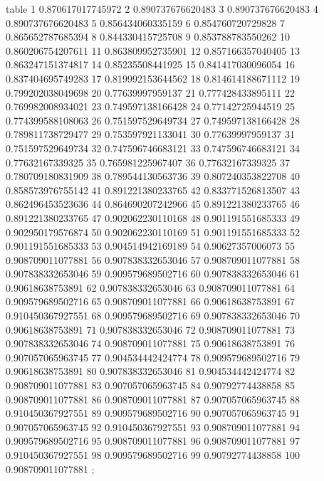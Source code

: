 table {%
	1 0.870617017745972
	2 0.890737676620483
	3 0.890737676620483
	4 0.890737676620483
	5 0.856434060335159
	6 0.854760720729828
	7 0.865652787685394
	8 0.844330415725708
	9 0.853788783550262
	10 0.860206754207611
	11 0.863809952735901
	12 0.857166357040405
	13 0.863247151374817
	14 0.85235508441925
	15 0.841417030096054
	16 0.837404695749283
	17 0.819992153644562
	18 0.814614188671112
	19 0.799202038049698
	20 0.77639997959137
	21 0.777428433895111
	22 0.769982008934021
	23 0.749597138166428
	24 0.77142725944519
	25 0.774399588108063
	26 0.751597529649734
	27 0.749597138166428
	28 0.789811738729477
	29 0.753597921133041
	30 0.77639997959137
	31 0.751597529649734
	32 0.747596746683121
	33 0.747596746683121
	34 0.77632167339325
	35 0.765981225967407
	36 0.77632167339325
	37 0.780709180831909
	38 0.789544130563736
	39 0.807240353822708
	40 0.858573976755142
	41 0.891221380233765
	42 0.833771526813507
	43 0.862496453523636
	44 0.864690207242966
	45 0.891221380233765
	46 0.891221380233765
	47 0.902062230110168
	48 0.901191551685333
	49 0.902950179576874
	50 0.902062230110169
	51 0.901191551685333
	52 0.901191551685333
	53 0.904514942169189
	54 0.90627357006073
	55 0.908709011077881
	56 0.907838332653046
	57 0.908709011077881
	58 0.907838332653046
	59 0.909579689502716
	60 0.907838332653046
	61 0.90618638753891
	62 0.907838332653046
	63 0.908709011077881
	64 0.909579689502716
	65 0.908709011077881
	66 0.90618638753891
	67 0.910450367927551
	68 0.909579689502716
	69 0.907838332653046
	70 0.90618638753891
	71 0.907838332653046
	72 0.908709011077881
	73 0.907838332653046
	74 0.908709011077881
	75 0.90618638753891
	76 0.907057065963745
	77 0.904534442424774
	78 0.909579689502716
	79 0.90618638753891
	80 0.907838332653046
	81 0.904534442424774
	82 0.908709011077881
	83 0.907057065963745
	84 0.90792774438858
	85 0.908709011077881
	86 0.908709011077881
	87 0.907057065963745
	88 0.910450367927551
	89 0.909579689502716
	90 0.907057065963745
	91 0.907057065963745
	92 0.910450367927551
	93 0.908709011077881
	94 0.909579689502716
	95 0.908709011077881
	96 0.908709011077881
	97 0.910450367927551
	98 0.909579689502716
	99 0.90792774438858
	100 0.908709011077881
};
